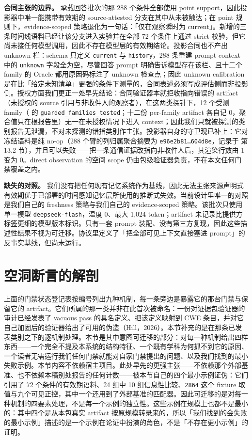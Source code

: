 \documentclass[UTF8,11pt]{ctexart}
\begin{document}
\noindent\textbf{合同主张的边界。} 承载回答批次的那 288 个条件全部使用 point support，因此投影器中唯一能携带有效期的 source-attested 分支在其中从未被触达；在 point 规则下，evidence-scoped 策略退化为一句话：「仅在观察瞬时为 current」。新增的三条时间线语料已经让该分支进入实验并在全部 72 个条件上通过 strict 校验，但它尚未接任何模型调用，因此不存在模型层的有效期结论。投影合同也不产出 unknown 栏：schema 只定义 \texttt{current} 与 \texttt{history}，288 条重建 prompt context 中的 \texttt{unknown} 字段全为空，尽管回答 prompt 明确告诉模型存在该栏、且十二个 family 的 Oracle 都用原因码标注了 unknown 检查点；因此 unknown calibration 是在比「给定未知清单」更强的条件下测量的，合同表述必须写成评估侧而非投影侧。授权方面我们更正一处早先结论：合同验证器本就拒收指向错误的 artifact（未授权的 source 引用与非收件人的观察者），在这两类探针下，12 个受测 family（ 的 \texttt{guarded\_families\_tested}；十二份 per-family artifact 各自记 0，聚合值只在根报告里）无一在未授权情况下进入 context；因此我们只就被探测的类别报告无泄漏，不对未探测的错指类别作主张。投影器自身的守卫现已补上：它对冻结语料是纯 no-op（288 个臂的列归属聚合摘要为 \texttt{e96e2b81\ldots604d8e}，记录于  第 13.2 节），并且可以失败——把一条通信证据改指向非收件人后，其渲染行数由 1 变为 0。direct observation 的空间 scope 仍由包级验证器负责，不在本文任何门禁覆盖之内。

\noindent\textbf{缺失的对照。} 我们没有把任何现有记忆系统作为基线，因此无法主张来源声明式有效期优于已部署的时间感知记忆层所使用的推断式失效。当前设计里唯一的对照是我们自己的 freshness 策略与我们自己的 evidence-scoped 策略。该批次只使用单一模型 \texttt{deepseek-flash}，温度 0、最大 1,024 token；artifact 未记录比提供方标签更细的模型版本标识。只有一套 prompt 装配、没有第三方复现，因此这些描述性结果不视为可迁移。协议里定义了「把全部可见上下文直接塞进 prompt」的反事实基线，但尚未运行。

\section{空洞断言的解剖}
\label{sec:anatomy-zh}
上面的门禁状态登记表按编号列出九种机制，每一条旁边是暴露它的那台门禁与保留它的 artifact。它们所属的那一类并非在此首次被命名：一份对证据包验证器的审计已经发表了 vacuous pass 的具名定义、把该定义映射到 CWE 条目，并对它自己加固后的验证器给出了可用的伪造（Hill，2026）。本节补充的是在那条已发表类别之下的逐机制处理。本节是其中意图可迁移的部分：对每一种机制给出四样东西——一个完全不提及本系统的结构特征、一个既有学科为何抓不到它的原因、一个读者无需运行我们任何门禁就能对自家门禁提出的问题、以及我们找到的最小失败示例。本节内容不依赖宿主项目。此处早先的更强主张——不依赖那个外部基准、也不依赖本稿别处报告的任何计数——被本节自己的四个最小示例证伪：它们引用了 72 个条件的有效期语料、24 组中 10 组信息性比较、\texttt{2864} 这个 fixture 取值与九个可见正控，其中一个还用到了外部基准的匹配器。因此可迁移的是对每一种机制的四要素处理，不是每一个示例的独立性。这些示例在规模上也都不是最小的：其中四个是从本包真实 artifact 按原规模转录来的，所以「我们找到的会失败的最小示例」描述的是一个示例在论证中扮演的角色，不是「不存在更小示例」的证明。
\end{document}
